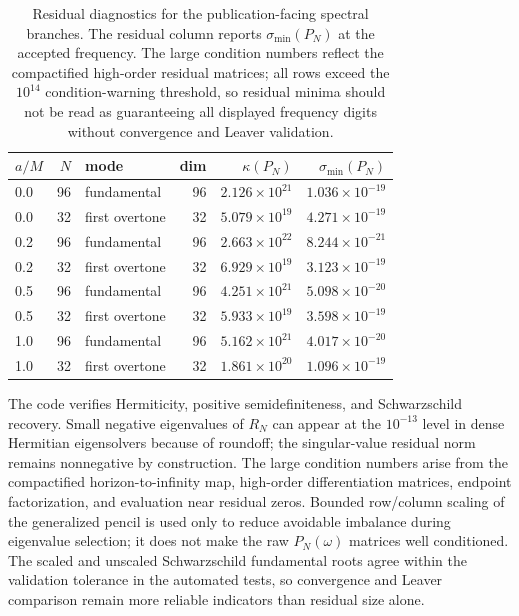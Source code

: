 ﻿\documentclass[12pt,a4paper]{article}
\begin{document}
\begin{table}[H]
\centering
\footnotesize
\renewcommand{\arraystretch}{1.14}
\begin{tabular}{lrlrrr}
\toprule
\(a/M\) & \(N\) & mode & dim & \(\kappa(P_N)\) & \(\sigma_{\min}(P_N)\)\\
\midrule
0.0 & 96 & fundamental & 96 & \(2.126\times10^{21}\) & \(1.036\times10^{-19}\)\\
0.0 & 32 & first overtone & 32 & \(5.079\times10^{19}\) & \(4.271\times10^{-19}\)\\
0.2 & 96 & fundamental & 96 & \(2.663\times10^{22}\) & \(8.244\times10^{-21}\)\\
0.2 & 32 & first overtone & 32 & \(6.929\times10^{19}\) & \(3.123\times10^{-19}\)\\
0.5 & 96 & fundamental & 96 & \(4.251\times10^{21}\) & \(5.098\times10^{-20}\)\\
0.5 & 32 & first overtone & 32 & \(5.933\times10^{19}\) & \(3.598\times10^{-19}\)\\
1.0 & 96 & fundamental & 96 & \(5.162\times10^{21}\) & \(4.017\times10^{-20}\)\\
1.0 & 32 & first overtone & 32 & \(1.861\times10^{20}\) & \(1.096\times10^{-19}\)\\
\bottomrule
\end{tabular}
\caption{Residual diagnostics for the publication-facing spectral branches. The residual column reports \(\sigma_{\min}(P_N)\) at the accepted frequency. The large condition numbers reflect the compactified high-order residual matrices; all rows exceed the \(10^{14}\) condition-warning threshold, so residual minima should not be read as guaranteeing all displayed frequency digits without convergence and Leaver validation.}
\label{tab:residualdiagnostics}
\end{table}

The code verifies Hermiticity, positive semidefiniteness, and Schwarzschild recovery. Small negative eigenvalues of \(R_N\) can appear at the \(10^{-13}\) level in dense Hermitian eigensolvers because of roundoff; the singular-value residual norm remains nonnegative by construction. The large condition numbers arise from the compactified horizon-to-infinity map, high-order differentiation matrices, endpoint factorization, and evaluation near residual zeros. Bounded row/column scaling of the generalized pencil is used only to reduce avoidable imbalance during eigenvalue selection; it does not make the raw \(P_N(\omega)\) matrices well conditioned. The scaled and unscaled Schwarzschild fundamental roots agree within the validation tolerance in the automated tests, so convergence and Leaver comparison remain more reliable indicators than residual size alone.
\end{document}
